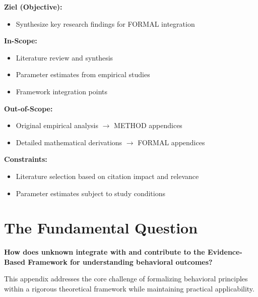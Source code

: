 \begin{tcolorbox}[
    colback=orange!5!white,
    colframe=orange!75!black,
    title={\textbf{Appendix Scope: Ziel / In-Scope / Out-of-Scope / Constraints}},
    fonttitle=\bfseries
]

\textbf{Ziel (Objective):}
\begin{itemize}[nosep]
    \item Synthesize key research findings for FORMAL integration
\end{itemize}

\textbf{In-Scope:}
\begin{itemize}[nosep]
    \item Literature review and synthesis
    \item Parameter estimates from empirical studies
    \item Framework integration points
\end{itemize}

\textbf{Out-of-Scope:}
\begin{itemize}[nosep]
    \item Original empirical analysis $\rightarrow$ METHOD appendices
    \item Detailed mathematical derivations $\rightarrow$ FORMAL appendices
\end{itemize}

\textbf{Constraints:}
\begin{itemize}[nosep]
    \item Literature selection based on citation impact and relevance
    \item Parameter estimates subject to study conditions
\end{itemize}

\end{tcolorbox}

\section{The Fundamental Question}
\label{sec:mec-fundamental}

\begin{tcolorbox}[
    colback=red!5!white,
    colframe=red!75!black,
    title={\textbf{Fundamental Question}}
]
\textbf{How does unknown integrate with and contribute to the
Evidence-Based Framework for understanding behavioral outcomes?}

This appendix addresses the core challenge of formalizing behavioral principles
within a rigorous theoretical framework while maintaining practical applicability.
\end{tcolorbox}


